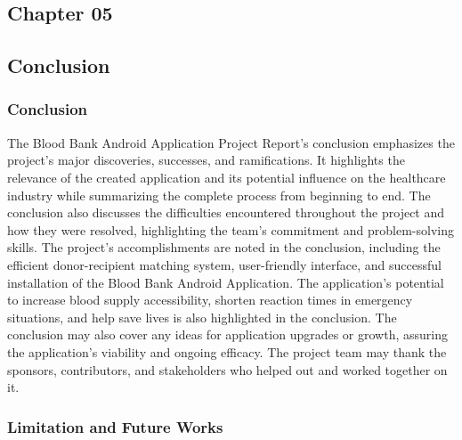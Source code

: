 \begin{center}
\chapter{Chapter 05}
\end{center}
\vspace{11mm}
\section{Conclusion}
\subsection{Conclusion}
The Blood Bank Android Application Project Report's conclusion emphasizes the project's major
discoveries, successes, and ramifications. It highlights the relevance of the created application 
and its potential influence on the healthcare industry while summarizing the complete process
from beginning to end. The conclusion also discusses the difficulties encountered throughout the
project and how they were resolved, highlighting the team's commitment and problem-solving
skills. The project's accomplishments are noted in the conclusion, including the efficient donor-recipient matching system, user-friendly interface, and successful installation of the Blood Bank
Android Application. The application's potential to increase blood supply accessibility, shorten
reaction times in emergency situations, and help save lives is also highlighted in the conclusion.
The conclusion may also cover any ideas for application upgrades or growth, assuring the
application's viability and ongoing efficacy. The project team may thank the sponsors,
contributors, and stakeholders who helped out and worked together on it.

\subsection{Limitation and Future Works}
